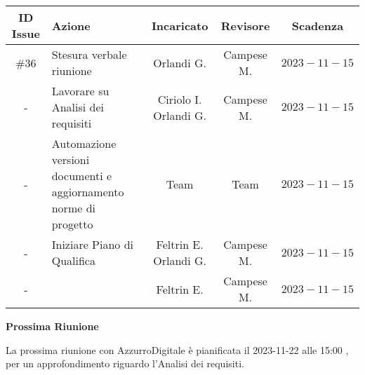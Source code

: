 \documentclass[10pt, a4paper]{article}
\begin{document}
\vspace{7em}

{\renewcommand{\arraystretch}{1.5}
\begin{tabularx}{\textwidth}{c|X|c|c|c}
\textbf{ID Issue} & \textbf{Azione} & \textbf{Incaricato} & \textbf{Revisore} & \textbf{Scadenza} \\
\hline
\#36 &
Stesura verbale riunione &
Orlandi G. &
Campese M. &
$2023-11-15$ \\
\hline
- &
Lavorare su Analisi dei requisiti & 
Ciriolo I. Orlandi G. &
Campese M. &
$2023-11-15$ \\
\hline
- &
Automazione versioni documenti e aggiornamento norme di progetto &
Team &
Team &
$2023-11-15$ \\
\hline
- &
Iniziare Piano di Qualifica &
Feltrin E. Orlandi G. &
Campese M. &
$2023-11-15$ \\
\hline
- &
 &
Feltrin E. &
Campese M. &
$2023-11-15$ \\
\end{tabularx}}

\vspace{3em}


\textbf{Prossima Riunione}

La prossima riunione con AzzurroDigitale è pianificata il 2023-11-22 alle 15:00 , per un approfondimento riguardo l'Analisi dei requisiti.
\end{document}
